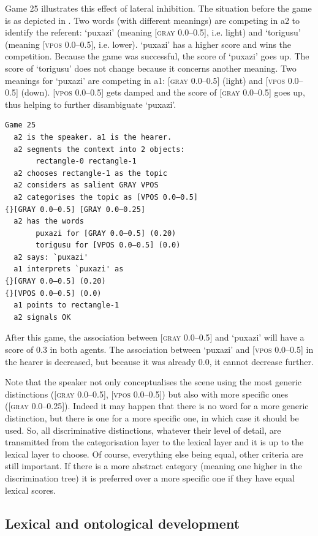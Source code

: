 Game 25 illustrates this effect of 
lateral inhibition. The situation before the game is 
as depicted in . 
Two words (with different meanings) are competing in {\bfshape  a2} to 
identify the referent: `puxazi' (meaning 
{}[\textsc{gray} 0.0–0.5], i.e. light) and `torigusu'
(meaning [\textsc{vpos} 0.0–0.5], i.e. lower).  `puxazi' has
a higher score and wins the competition. Because the game 
was successful, the score
of `puxazi' goes up. The score of `torigusu' 
does not change because it concerns another 
meaning. Two meanings for `puxazi'
are competing in {\bfshape  a1}: [\textsc{gray} 0.0–0.5] (light)
and [\textsc{vpos} 0.0–0.5] (down). [\textsc{vpos} 0.0–0.5] gets damped and 
the score of [\textsc{gray} 0.0–0.5] goes up, thus helping to 
further disambiguate `puxazi'. \clearpage
\begin{verbatim}
Game 25
  a2 is the speaker. a1 is the hearer. 
  a2 segments the context into 2 objects: 
       rectangle-0 rectangle-1 
  a2 chooses rectangle-1 as the topic 
  a2 considers as salient GRAY VPOS
  a2 categorises the topic as [VPOS 0.0–0.5] 
{}[GRAY 0.0–0.5] [GRAY 0.0–0.25]
  a2 has the words
       puxazi for [GRAY 0.0–0.5] (0.20)
       torigusu for [VPOS 0.0–0.5] (0.0)
  a2 says: `puxazi'
  a1 interprets `puxazi' as
{}[GRAY 0.0–0.5] (0.20)
{}[VPOS 0.0–0.5] (0.0)
  a1 points to rectangle-1
  a2 signals OK
\end{verbatim}
After this game, the association between [\textsc{gray} 0.0–0.5] 
and `puxazi' will have a score of 0.3 in both agents. 
The association between `puxazi' and [\textsc{vpos} 0.0–0.5] 
in the hearer is decreased, but because it was already 
0.0, it cannot decrease further. 

Note that the speaker not only conceptualises the scene using 
the most generic distinctions ([\textsc{gray} 0.0–0.5], 
{}[\textsc{vpos} 0.0–0.5]) but also
with more specific ones ([\textsc{gray} 0.0–0.25]). Indeed it 
may happen that there is no word for a more generic 
distinction, but there is one for a more specific 
one, in which case it should be used. 
So, all discriminative distinctions, 
whatever their level of detail, are
transmitted from the categorisation layer to the 
lexical layer and it is up to the lexical layer
to choose. Of course, everything else being equal, 
other criteria are still important. If there is a 
more abstract category (meaning one higher in the 
discrimination tree) it is preferred over a more 
specific one if they have equal lexical scores. 

\subsection{Lexical and ontological development} 


